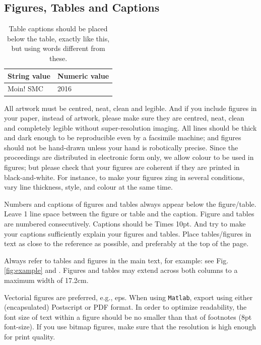 \documentclass{article}
\begin{document}
\subsection{Figures, Tables and Captions}
\begin{table}[t]
 \begin{center}
 \begin{tabular}{|l|l|}
  \hline
  String value & Numeric value \\
  \hline
  Moin! SMC & 2016 \\
  \hline
 \end{tabular}
\end{center}
 \caption{Table captions should be placed below the table, exactly like this,
 but using words different from these.}
 \label{tab:example}
\end{table}

All artwork must be centred, neat, clean and legible.
And if you include figures in your paper, instead of artwork,
please make sure they are centred, neat, clean
and completely legible without super-resolution imaging.
All lines should be thick and dark enough to be reproducible
even by a facsimile machine;
and figures should not be hand-drawn unless your hand is robotically precise.
Since the proceedings are distributed in electronic form only, 
we allow colour to be used in figures;
but please check that your figures are 
coherent if they are printed in black-and-white.
For instance, to make your figures zing in several conditions,
vary line thickness, style, and colour at the same time.

Numbers and captions of figures and tables always appear below the figure/table.
Leave 1 line space between the figure or table and the caption.
Figure and tables are numbered consecutively. 
Captions should be Times 10pt.
And try to make your captions sufficiently explain your figures and tables.
Place tables/figures in text as close to the reference as possible, 
and preferably at the top of the page.

Always refer to tables and figures in the main text, for example:
see Fig. \ref{fig:example} and .
Figures and tables may extend across both columns to a maximum width of 17.2cm.

Vectorial figures are preferred, e.g., eps.
When using \texttt{Matlab}, 
export using either (encapsulated) Postscript or PDF format. 
In order to optimize readability, 
the font size of text within a figure should be no smaller than
that of footnotes (8pt font-size). 
If you use bitmap figures, make sure that 
the resolution is high enough for print quality. 
\end{document}
